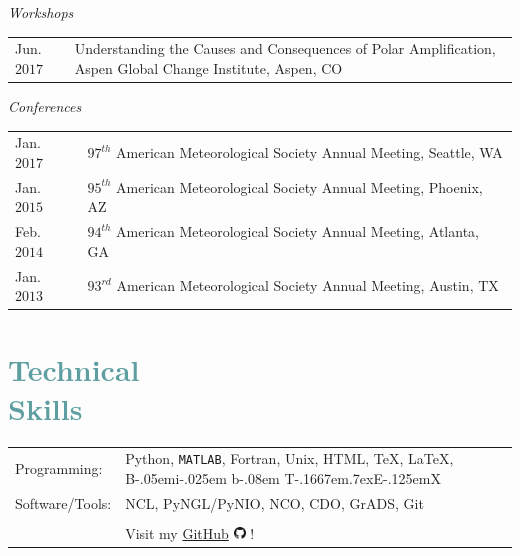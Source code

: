 \documentclass[margin,line,palatino,courier,10pt]{res}
\def\BibTeX{{\rm B\kern-.05em{\sc i\kern-.025em b}\kern-.08em
    T\kern-.1667em\lower.7ex\hbox{E}\kern-.125emX}}
\begin{document}
\begin{resume}
\textit{Workshops}
\vspace*{0.05in}\\
\begin{tabular}{@{}p{0.8in}p{4in}}
Jun. $2017$ & Understanding the Causes and Consequences of Polar Amplification, Aspen Global Change Institute, Aspen, CO
\end{tabular}

\textit{Conferences}
\vspace*{0.05in}\\
\begin{tabular}{@{}p{0.8in}p{4in}}
Jan. $2017$ & $97^ {th} $ American Meteorological Society Annual Meeting, Seattle, WA \\
Jan. $2015$ & $95^ {th} $ American Meteorological Society Annual Meeting, Phoenix, AZ \\
Feb. $2014$ & $94^ {th} $ American Meteorological Society Annual Meeting, Atlanta, GA \\
Jan. $2013$ & $93^ {rd} $ American Meteorological Society Annual Meeting, Austin, TX \\
\end{tabular}

\section{\sc \textcolor{CadetBlue}{\large{Technical \\ Skills}}}
\vspace*{0.05in}
\begin{tabular}{@{}p{0.8in}p{6in}}

Programming:& Python, \texttt{MATLAB}, Fortran, Unix, HTML, \TeX, \LaTeX, \BibTeX \\
Software/Tools: & NCL, PyNGL/PyNIO, NCO, CDO, GrADS, Git\\\\

& Visit my \href{https://github.com/zmlabe}{GitHub} \includegraphics[height=9pt]{github.png} !\\
\end{tabular}


\noindent\makebox[\linewidth][r]{\rule{\textwidth}{5pt}}
\vspace{-0.3in}


\end{resume}
\end{document}
